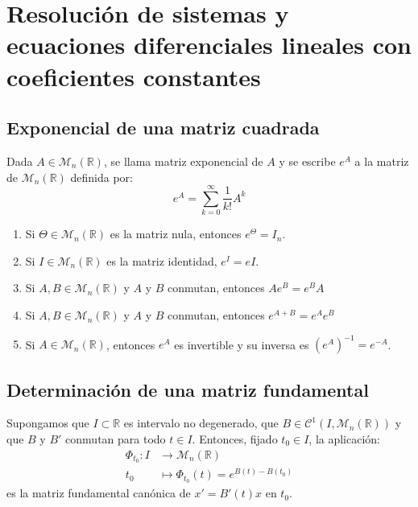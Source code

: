 \chapter{Resolución de sistemas y ecuaciones diferenciales lineales con coeficientes constantes}
\section{Exponencial de una matriz cuadrada}
\begin{definition}
    Dada $A \in \mathcal{M}_n(\mathbb{R})$, se llama matriz exponencial de $A$ y se escribe $e^A$ a la matriz de $\mathcal{M}_n(\mathbb{R})$ definida por:
    $$e^A = \sum_{k=0}^\infty \frac{1}{k!}A^k$$
\end{definition}

\begin{proposition}
    \hfill
    \begin{enumerate}
        \item Si $\Theta \in \mathcal{M}_n(\mathbb{R})$ es la matriz nula, entonces $e^\Theta = I_n$.
        \item Si $I \in \mathcal{M}_n(\mathbb{R})$ es la matriz identidad, $e^I = eI$.
        \item Si $A, B \in \mathcal{M}_n(\mathbb{R})$ y $A$ y $B$ conmutan, entonces $Ae^B = e^BA$
        \item Si $A, B \in \mathcal{M}_n(\mathbb{R})$ y $A$ y $B$ conmutan, entonces $e^{A+B} = e^Ae^B$
        \item Si $A \in \mathcal{M}_n(\mathbb{R})$, entonces $e^A$ es invertible y su inversa es $(e^A)^{-1} = e^{-A}$.
    \end{enumerate}
\end{proposition}

\section{Determinación de una matriz fundamental}
\begin{theorem}
    Supongamos que $I \subset \mathbb{R}$ es intervalo no degenerado, que $B \in \mathcal{C}^1(I, \mathcal{M}_n(\mathbb{R}))$ y que $B$ y $B'$ conmutan para todo $t \in I$.
    Entonces, fijado $t_0 \in I$, la aplicación:
    \begin{align*}
        \Phi_{t_0}: I & \to \mathcal{M}_n(\mathbb{R})             \\
        t_0           & \mapsto \Phi_{t_0}(t) = e^{B(t) - B(t_0)}
    \end{align*}
    es la matriz fundamental canónica de $x' = B'(t)x$ en $t_0$.
\end{theorem}

